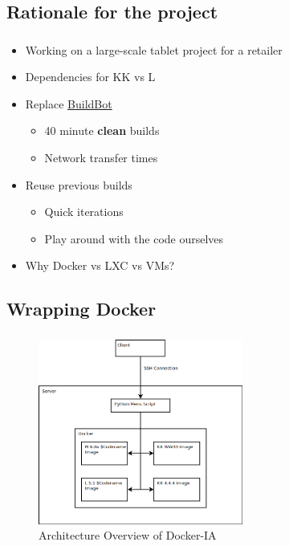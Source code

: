 \documentclass[10pt]{beamer}
\makeatletter
\newcommand*{\currentname}{\@currentlabelname}
\makeatother
\begin{document}
\subsection{Rationale for the project}
\begin{frame}
	\frametitle{\currentname}

	\begin{itemize}
		\item Working on a large-scale tablet project for a retailer
		\item Dependencies for KK vs L

		\item Replace \href{http://buildbot.net}{BuildBot}
			\begin{itemize}
				\item 40 minute \textbf{clean} builds
				\item Network transfer times
			\end{itemize}
		\item Reuse previous builds
			\begin{itemize}
				\item Quick iterations
				\item Play around with the code ourselves
			\end{itemize}
		\item Why Docker vs LXC vs VMs?
	\end{itemize}
\end{frame}

\subsection{Wrapping Docker}
\begin{frame}
	\frametitle{\currentname}

	\begin{figure}[c]
		\includegraphics[width=0.6\textwidth]{./images/docker-architecture.png}
		\\Architecture Overview of Docker-IA
	\end{figure}
\end{frame}
\end{document}
